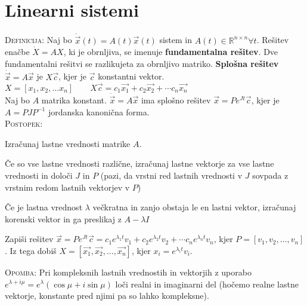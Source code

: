 \documentclass[8pt,a4paper]{amsart}
\theoremstyle{definition} %
\theoremstyle{plain} %
\newenvironment{itemize*}%
{
\begin{itemize}
\setlength{\itemsep}{0pt}
\setlength{\parskip}{1pt}
}
{\end{itemize}}
\newenvironment{enumerate*}%
{
\begin{enumerate}
\setlength{\itemsep}{0pt}
\setlength{\parskip}{1pt}
}
{\end{enumerate}}
\newcommand{\R}{\mathbb R}
\begin{document}
\thispagestyle{empty}
\setlength{\parindent}{0pt}
\section*{\textbf{Linearni sistemi}} %

\textsc{Definicija: }Naj bo $\dot{\vec{x}}(t) = A(t) \vec{x}(t)$ sistem in $A(t)
\in \R^{n \times n} \forall t$. Rešitev enačbe $\dot{X} = AX$, ki je obrnljiva,
se imenuje \textbf{fundamentalna rešitev}. Dve fundamentalni rešitvi se
razlikujeta za obrnljivo matriko. \textbf{Splošna rešitev}
$\dot{\vec{x}} = A \vec{x}$ je $X\vec{c}$, kjer je $\vec{c}$ konstantni vektor. \\

$X = [x_1,x_2,\ldots x_n] \qquad X\vec{c} = c_1\vec{x_1} + c_2\vec{x_2} + \cdots
c_n\vec{x_n}$ \\

Naj bo $A$ matrika konstant. $\dot{\vec{x}} = A \vec{x}$ ima splošno rešitev
$\vec{x} = Pe^{Jt}\vec{c}$, kjer je $A=PJP^{-1}$ jordanska kanonična forma.  \\

\textsc{Postopek:}
\begin{enumerate*}
  \item Izračunaj lastne vrednosti
    matrike $A$.
    \begin{itemize*}
      \item Če so vse lastne vrednosti različne,
        izračunaj lastne vektorje za vse lastne vrednosti in določi $J$ in $P$ (pazi,
        da vrstni red lastnih vrednosti v $J$ sovpada z vrstnim redom lastnih vektorjev
        v $P$)
      \item Če je lastna vrednost $\lambda$ večkratna in zanjo obstaja le en
        lastni vektor, izračunaj korenski vektor in ga preslikaj z $A-\lambda I$
    \end{itemize*}
  \item Zapiši rešitev $\vec{x} = Pe^{Jt}\vec{c} = c_1
    e^{\lambda_1t} v_1 + c_2 e^{\lambda_2t} v_2 + \cdots c_n e^{\lambda_nt} v_n$,
    kjer $P = [v_1,v_2,\ldots ,v_n]$. Iz tega dobiš $X = [\vec{x_1},\vec{x_2},
    \ldots, \vec{x_n}]$, kjer $x_i = e^{\lambda_it} v_i$.
\end{enumerate*}

\textsc{Opomba:} Pri kompleksnih lastnih vrednostih in vektorjih z uporabo
$e^{\lambda + i\mu} = e^{\lambda}(\cos{\mu}+i\sin{\mu})$ loči realni in
imaginarni del (hočemo realne lastne vektorje, konstante pred njimi pa so lahko
kompleksne).
\end{document}
